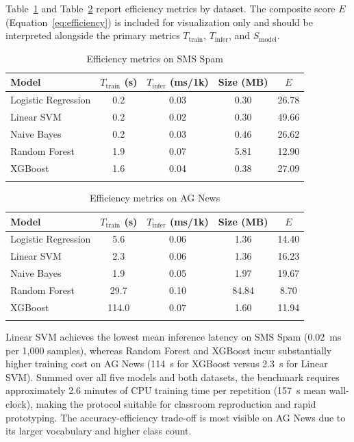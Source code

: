 \documentclass[pdflatex,sn-mathphys-num]{sn-jnl}
\begin{document}
Table~\ref{tab:efficiency_sms} and Table~\ref{tab:efficiency_ag} report efficiency metrics by dataset. The composite score $E$ (Equation~\ref{eq:efficiency}) is included for visualization only and should be interpreted alongside the primary metrics $T_{\text{train}}$, $T_{\text{infer}}$, and $S_{\text{model}}$.

\begin{table}[t]
\caption{Efficiency metrics on SMS Spam}\label{tab:efficiency_sms}
\begin{tabular*}{\textwidth}{@{\extracolsep\fill}lcccc}
\toprule
Model & $T_{\text{train}}$ (s) & $T_{\text{infer}}$ (ms/1k) & Size (MB) & $E$ \\
\midrule
Logistic Regression & 0.2 & 0.03 & 0.30 & 26.78 \\
Linear SVM          & 0.2 & 0.02 & 0.30 & 49.66 \\
Naive Bayes         & 0.2 & 0.03 & 0.46 & 26.62 \\
Random Forest       & 1.9 & 0.07 & 5.81 & 12.90 \\
XGBoost             & 1.6 & 0.04 & 0.38 & 27.09 \\
\botrule
\end{tabular*}
\end{table}

\begin{table}[t]
\caption{Efficiency metrics on AG News}\label{tab:efficiency_ag}
\begin{tabular*}{\textwidth}{@{\extracolsep\fill}lcccc}
\toprule
Model & $T_{\text{train}}$ (s) & $T_{\text{infer}}$ (ms/1k) & Size (MB) & $E$ \\
\midrule
Logistic Regression & 5.6 & 0.06 & 1.36 & 14.40 \\
Linear SVM          & 2.3 & 0.06 & 1.36 & 16.23 \\
Naive Bayes         & 1.9 & 0.05 & 1.97 & 19.67 \\
Random Forest       & 29.7 & 0.10 & 84.84 & 8.70 \\
XGBoost             & 114.0 & 0.07 & 1.60 & 11.94 \\
\botrule
\end{tabular*}
\end{table}

Linear SVM achieves the lowest mean inference latency on SMS Spam (0.02~ms per 1{,}000 samples), whereas Random Forest and XGBoost incur substantially higher training cost on AG News (114~s for XGBoost versus 2.3~s for Linear SVM). Summed over all five models and both datasets, the benchmark requires approximately 2.6 minutes of CPU training time per repetition (157~s mean wall-clock), making the protocol suitable for classroom reproduction and rapid prototyping. The accuracy-efficiency trade-off is most visible on AG News due to its larger vocabulary and higher class count.
\end{document}
